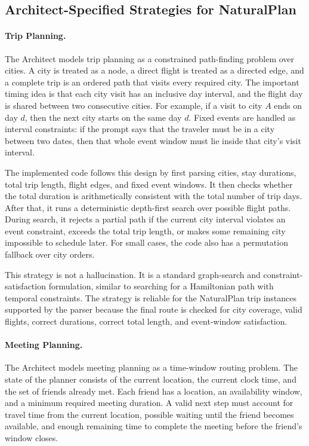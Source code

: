 \subsection{Architect-Specified Strategies for NaturalPlan}

\paragraph{Trip Planning.}
The Architect models trip planning as a constrained path-finding problem over
cities.  A city is treated as a node, a direct flight is treated as a directed
edge, and a complete trip is an ordered path that visits every required city.
The important timing idea is that each city visit has an inclusive day
interval, and the flight day is shared between two consecutive cities.  For
example, if a visit to city \(A\) ends on day \(d\), then the next city starts
on the same day \(d\).  Fixed events are handled as interval constraints: if
the prompt says that the traveler must be in a city between two dates, then
that whole event window must lie inside that city's visit interval.

The implemented code follows this design by first parsing cities, stay
durations, total trip length, flight edges, and fixed event windows.  It then
checks whether the total duration is arithmetically consistent with the total
number of trip days.  After that, it runs a deterministic depth-first search
over possible flight paths.  During search, it rejects a partial path if the
current city interval violates an event constraint, exceeds the total trip
length, or makes some remaining city impossible to schedule later.  For small
cases, the code also has a permutation fallback over city orders.

This strategy is not a hallucination.  It is a standard graph-search and
constraint-satisfaction formulation, similar to searching for a Hamiltonian
path with temporal constraints.  The strategy is reliable for the NaturalPlan
trip instances supported by the parser because the final route is checked for
city coverage, valid flights, correct durations, correct total length, and
event-window satisfaction.

\paragraph{Meeting Planning.}
The Architect models meeting planning as a time-window routing problem.  The
state of the planner consists of the current location, the current clock time,
and the set of friends already met.  Each friend has a location, an
availability window, and a minimum required meeting duration.  A valid next
step must account for travel time from the current location, possible waiting
until the friend becomes available, and enough remaining time to complete the
meeting before the friend's window closes.

